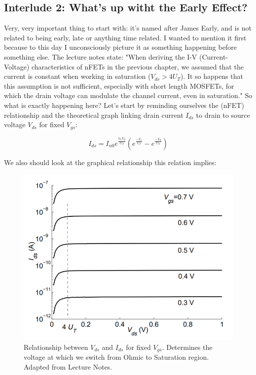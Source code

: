 \subsection{Interlude 2: What's up witht the Early Effect?}
Very, very important thing to start with: it's named after James Early, and is not related to being early, late or anything time related. I wanted to mention it first because to this day I unconsciously picture it as something happening before something else. 
The lecture notes state: "When deriving the I-V (Current-Voltage) characteristics of nFETs in the previous chapter, we assumed that the current is constant when working in saturation ($V_{ds} > 4U_T$). It so happens that this assumption is not sufficient, especially with short length MOSFETs, for which the drain voltage can modulate the channel current, even in saturation." So what is exactly happening here?  
Let's start by reminding ourselves the (nFET) relationship and the theoretical graph linking drain current $I_{ds}$ to drain to source voltage $V_{ds}$ for fixed $V_{gs}$:

\begin{equation}
I_{ds} = I_{n0} e^{\frac{\kappa_{n}V_g}{U_T}}(e^\frac{-V_s}{U_T} - e^\frac{-V_d}{U_T})
\end{equation}

We also should look at the graphical relationship this relation implies:

\begin{figure}[H]
    \centering
    \includegraphics[width=0.95\linewidth]{../../Figures/Vds_Vs_Ids_No_Early_Effect.PNG}
    \caption{Relationship between $V_{ds}$ and $I_{ds}$ for fixed $V_{gs}$. Determines the voltage at which we switch from Ohmic to Saturation region. Adapted from Lecture Notes.}
    \label{fig:basalandcerebellum}
\end{figure}

